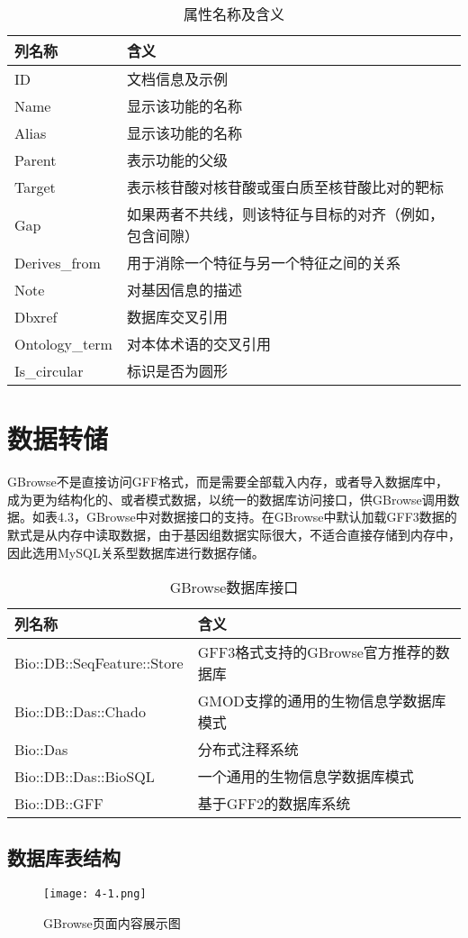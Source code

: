 	\begin{table}[!htbp]
		\centering
		\begin{tabular}{ll}	
			\toprule
			列名称& 含义\\
			\midrule
			ID&文档信息及示例\\
			Name&显示该功能的名称\\
			Alias&显示该功能的名称\\
			Parent&表示功能的父级 \\
			Target&表示核苷酸对核苷酸或蛋白质至核苷酸比对的靶标\\
			Gap&如果两者不共线，则该特征与目标的对齐（例如，包含间隙）\\
			Derives\_from&用于消除一个特征与另一个特征之间的关系\\
			Note&对基因信息的描述\\
			Dbxref&数据库交叉引用\\
			Ontology\_term&对本体术语的交叉引用\\
			Is\_circular&标识是否为圆形\\
			\bottomrule
		\end{tabular}
		\caption{属性名称及含义}
	\end{table}
	\section{数据转储}
	GBrowse不是直接访问GFF格式，而是需要全部载入内存，或者导入数据库中，成为更为结构化的、或者模式数据，以统一的数据库访问接口，供GBrowse调用数据。如表4.3，GBrowse中对数据接口的支持。在GBrowse中默认加载GFF3数据的默式是从内存中读取数据，由于基因组数据实际很大，不适合直接存储到内存中，因此选用MySQL关系型数据库进行数据存储。
	\begin{table}[!htbp]
		\centering
		\begin{tabular}{ll}	
			\toprule
			列名称& 含义\\
			\midrule
			Bio::DB::SeqFeature::Store&GFF3格式支持的GBrowse官方推荐的数据库\\
			Bio::DB::Das::Chado&GMOD支撑的通用的生物信息学数据库模式\\
			Bio::Das&分布式注释系统\\
			Bio::DB::Das::BioSQL&一个通用的生物信息学数据库模式 \\
			Bio::DB::GFF&基于GFF2的数据库系统 \\
			\bottomrule
		\end{tabular}
		\caption{GBrowse数据库接口}
	\end{table}
	\subsection{数据库表结构}
	\begin{figure}
		\centering
		\texttt{[image: 4-1.png]}
		\caption{GBrowse页面内容展示图}
	\end{figure}
